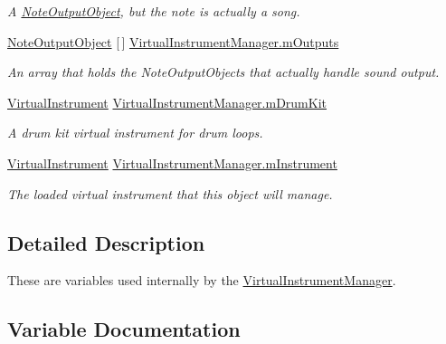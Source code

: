 \begin{DoxyCompactItemize}
\begin{DoxyCompactList}\small\item\em A \hyperlink{class_note_output_object}{Note\+Output\+Object}, but the note is actually a song. \end{DoxyCompactList}\item 
\hyperlink{class_note_output_object}{Note\+Output\+Object} \mbox{[}$\,$\mbox{]} \hyperlink{group___v_i_m_priv_ga53f837fd01475fa35629a650e7fa00e3}{Virtual\+Instrument\+Manager.\+m\+Outputs}
\begin{DoxyCompactList}\small\item\em An array that holds the Note\+Output\+Objects that actually handle sound output. \end{DoxyCompactList}\item 
\hyperlink{class_virtual_instrument}{Virtual\+Instrument} \hyperlink{group___v_i_m_priv_ga0bc7c9f776b0d2dae0ccb1f1ee5f2143}{Virtual\+Instrument\+Manager.\+m\+Drum\+Kit}
\begin{DoxyCompactList}\small\item\em A drum kit virtual instrument for drum loops. \end{DoxyCompactList}\item 
\hyperlink{class_virtual_instrument}{Virtual\+Instrument} \hyperlink{group___v_i_m_priv_gaed435d1f9be09864846db4322dc21fd1}{Virtual\+Instrument\+Manager.\+m\+Instrument}
\begin{DoxyCompactList}\small\item\em The loaded virtual instrument that this object will manage. \end{DoxyCompactList}\end{DoxyCompactItemize}


\subsection{Detailed Description}
These are variables used internally by the \hyperlink{class_virtual_instrument_manager}{Virtual\+Instrument\+Manager}. 

\subsection{Variable Documentation}
\mbox{\label{group___v_i_m_priv_ga5cedf9995d59b416412677e6004b659c}} 
